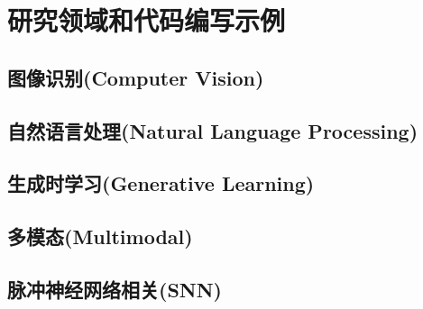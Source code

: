 \section{研究领域和代码编写示例}

\subsection{图像识别(Computer Vision)}


\subsection{自然语言处理(Natural Language Processing)}


\subsection{生成时学习(Generative Learning)}


\subsection{多模态(Multimodal)}


\subsection{脉冲神经网络相关(SNN)}







